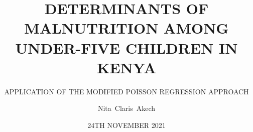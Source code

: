 
\author{Nita~Claris~Akech}
\title {DETERMINANTS OF MALNUTRITION AMONG UNDER-FIVE CHILDREN IN KENYA}
\subtitle{APPLICATION OF THE MODIFIED POISSON REGRESSION APPROACH}
\date{24TH NOVEMBER 2021}
\begin{frame}[plain]
		\maketitle
\end{frame}
